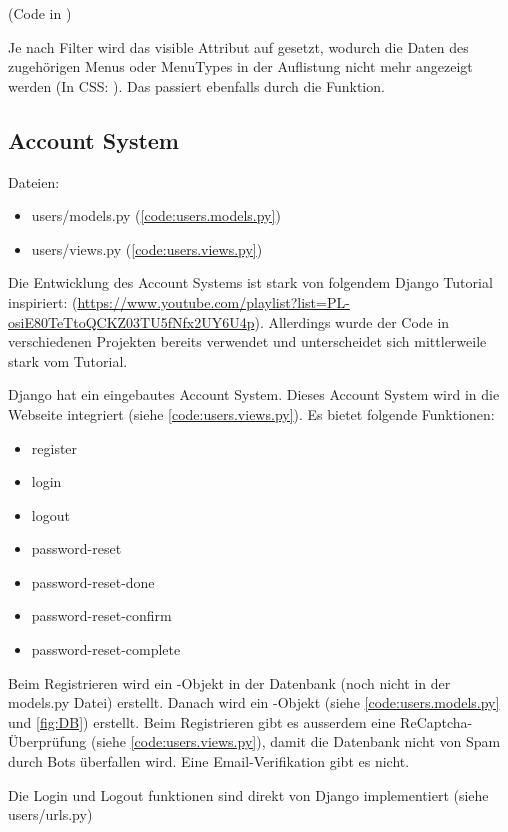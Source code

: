 (Code in )

Je nach Filter wird das visible Attribut auf  gesetzt, wodurch die
Daten des zugehörigen Menus oder MenuTypes in der Auflistung nicht mehr
angezeigt werden (In CSS: ). Das passiert ebenfalls durch
die  Funktion.

\newpage

\subsection{Account System} \label{spez:Account}

Dateien:
\begin{itemize}
    \item users/models.py (\ref{code:users.models.py})
    \item users/views.py (\ref{code:users.views.py})
\end{itemize}

Die Entwicklung des Account Systems ist stark von folgendem Django Tutorial
inspiriert:
(\url{https://www.youtube.com/playlist?list=PL-osiE80TeTtoQCKZ03TU5fNfx2UY6U4p}).
Allerdings wurde der Code in verschiedenen Projekten bereits verwendet und
unterscheidet sich mittlerweile stark vom Tutorial.

Django hat ein eingebautes Account System. Dieses Account System wird in die
Webseite integriert (siehe \ref{code:users.views.py}). Es bietet folgende
Funktionen:
\begin{itemize}
    \item register
    \item login
    \item logout
    \item password-reset
    \item password-reset-done
    \item password-reset-confirm
    \item password-reset-complete
\end{itemize}

Beim Registrieren wird ein -Objekt in der Datenbank (noch nicht in
der models.py Datei) erstellt. Danach wird ein -Objekt (siehe
\ref{code:users.models.py} und \ref{fig:DB}) erstellt. Beim Registrieren gibt es
ausserdem eine ReCaptcha-Überprüfung (siehe \ref{code:users.views.py}), damit
die Datenbank nicht von Spam durch Bots überfallen wird. Eine Email-Verifikation
gibt es nicht.

Die Login und Logout funktionen sind direkt von Django implementiert (siehe users/urls.py)

